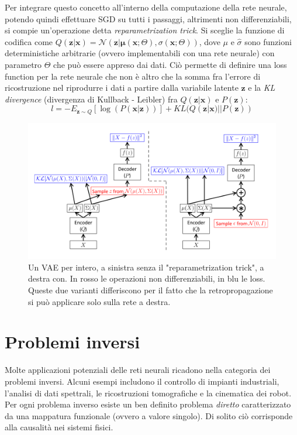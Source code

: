 Per integrare questo concetto all'interno della computazione della rete neurale, potendo quindi effettuare SGD su tutti i passaggi, altrimenti non differenziabili, si compie un'operazione detta \textit{reparametrization trick}. Si sceglie la funzione di codifica come $Q(\boldsymbol{z} | \boldsymbol{x}) = \mathcal{N}(\boldsymbol{z} | \boldsymbol{\mu}(\boldsymbol{x}; \Theta), \sigma(\boldsymbol{x}; \Theta))$, dove $\mu$ e $\hat\sigma$ sono funzioni deterministiche arbitrarie (ovvero implementabili con una rete neurale) con parametro $\Theta$ che può essere appreso dai dati. Ciò permette di definire una loss function per la rete neurale che non è altro che la somma fra l'errore di ricostruzione nel riprodurre i dati a partire dalla variabile latente $\boldsymbol{z}$ e la \textit{KL divergence} (divergenza di Kullback - Leibler) fra $Q(\boldsymbol{z} | \boldsymbol{x})$ e $P(\boldsymbol{z})$:
\begin{equation}
	\label{vae_loss}
	l = -E_{\boldsymbol{z}\sim Q}[\log(P(\boldsymbol{x} | \boldsymbol{z}))] + KL(Q(\boldsymbol{z} | \boldsymbol{x}) || P(\boldsymbol{z}))
\end{equation}
\begin{figure}[ht]
	\centering
	\includegraphics[width=\textwidth]{img/vae_struct.png}
	\caption{Un VAE per intero, a sinistra senza il "reparametrization trick", a destra con. In rosso le operazioni non differenziabili, in blu le loss. Queste due varianti differiscono per il fatto che la retropropagazione si può applicare solo sulla rete a destra.}
	\label{fig:1.14}
\end{figure}

\section{Problemi inversi} %
\label{sec:problemi_inversi}
Molte applicazioni potenziali delle reti neurali ricadono nella categoria dei problemi inversi. Alcuni esempi includono il controllo di impianti industriali, l'analisi di dati spettrali, le ricostruzioni tomografiche e la cinematica dei robot. Per ogni problema inverso esiste un ben definito problema \textit{diretto} caratterizzato da una mappatura funzionale (ovvero a valore singolo). Di solito ciò corrisponde alla causalità nei sistemi fisici. 

